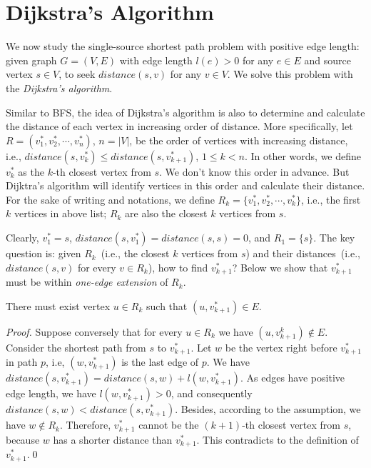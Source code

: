 \setcounter{definition}{0} \setcounter{property}{0} \setcounter{claim}{0} \setcounter{fact}{0} \setcounter{corollary}{0} \setcounter{figure}{0}
\section{Dijkstra's Algorithm}


We now study the single-source shortest path problem with positive edge length:
given graph $G = (V, E)$ with edge length $l(e) > 0$ for any $e\in E$ and
source vertex $s\in V$, to seek $distance(s, v)$ for any $v\in V$.
We solve this problem with the \emph{Dijkstra's algorithm}.

Similar to BFS, the idea of Dijkstra's algorithm is also to
determine and calculate the distance of each vertex
in increasing order of distance.
More specifically, let $R = (v_1^*, v_2^*, \cdots, v_n^*)$, $n = |V|$,
be the order of vertices with increasing distance, i.e., $distance(s, v_k^*) \le distance(s, v_{k+1}^*)$, $1\le k < n$.
In other words, we define $v_k^*$ as the $k$-th closest vertex from $s$.
We don't know this order in advance.
But Dijktra's algorithm will identify vertices in this order and calculate
their distance.
For the sake of writing and notations, we define $R_k = \{v_1^*, v_2^*, \cdots, v_k^*\}$, i.e., 
the first $k$ vertices in above list; $R_k$ are also the closest $k$ vertices from $s$.

Clearly, $v_1^* = s$, $distance(s, v_1^*) = distance(s, s) = 0$, and $R_1 = \{s\}$.
The key question is: given $R_k$~(i.e., the closest $k$ vertices from $s$) and their distances~(i.e., $distance(s, v)$ for every $v\in R_k$),
how to find $v_{k + 1}^*$?
Below we show that $v_{k + 1}^*$ must be within \emph{one-edge extension} of $R_k$.
\begin{claim}
There must exist vertex $u\in R_k$ such that $(u, v_{k+1}^*) \in E$.
\end{claim}
\emph{Proof.} Suppose conversely that for every $u\in R_k$ we have $(u, v_{k+1}^k)\not\in E$.
Consider the shortest path from $s$ to $v_{k+1}^*$.
Let $w$ be the vertex right before $v_{k+1}^*$ in path $p$, i.e, $(w, v_{k+1}^*)$ is the last edge of $p$.
We have $distance(s, v_{k+1}^*) = distance(s, w) + l(w, v_{k+1}^*)$. %
As edges have positive edge length, we have $l(w, v_{k+1}^*) > 0$, and consequently
$distance(s, w) < distance(s, v_{k+1}^*)$.
Besides, according to the assumption, we have $w\not\in R_k$.
Therefore, $v_{k+1}^*$ cannot be the $(k+1)$-th closest vertex from $s$,
because $w$ has a shorter distance than $v_{k+1}^*$. This contradicts to the definition of $v_{k+1}^*$.\qed

